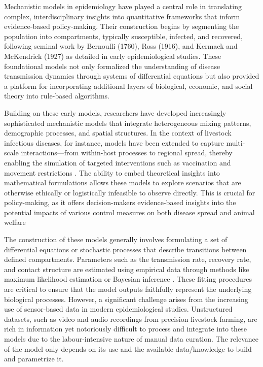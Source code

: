 Mechanistic models in epidemiology have played a central role in translating complex, interdisciplinary insights into quantitative frameworks that inform evidence-based policy-making. Their construction begins by segmenting the population into compartments, typically susceptible, infected, and recovered, following seminal work by Bernoulli (1760), Ross (1916), and Kermack and McKendrick (1927) as detailed in early epidemiological studies. These foundational models not only formalized the understanding of disease transmission dynamics through systems of differential equations but also provided a platform for incorporating additional layers of biological, economic, and social theory into rule-based algorithms.

Building on these early models, researchers have developed increasingly sophisticated mechanistic models that integrate heterogeneous mixing patterns, demographic processes, and spatial structures. In the context of livestock infectious diseases, for instance, models have been extended to capture multi-scale interactions—from within-host processes to regional spread, thereby enabling the simulation of targeted interventions such as vaccination and movement restrictions 
\cite{Tomley2009, OIE2015}. The ability to embed theoretical insights into mathematical formulations allows these models to explore scenarios that are otherwise ethically or logistically infeasible to observe directly. This is crucial for policy-making, as it offers decision-makers evidence-based insights into the potential impacts of various control measures on both disease spread and animal welfare \cite{Ezanno2018, EZANNO2020100398}

The construction of these models generally involves formulating a set of differential equations or stochastic processes that describe transitions between defined compartments. Parameters such as the transmission rate, recovery rate, and contact structure are estimated using empirical data through methods like maximum likelihood estimation or Bayesian inference \cite{Keeling2008, Courcoul2010}. These fitting procedures are critical to ensure that the model outputs faithfully represent the underlying biological processes. However, a significant challenge arises from the increasing use of sensor-based data in modern epidemiological studies. Unstructured datasets, such as video and audio recordings from precision livestock farming, are rich in information yet notoriously difficult to process and integrate into these models due to the labour-intensive nature of manual data curation. The relevance of the model only depends on its use and the available data/knowledge to build and parametrize it. 

